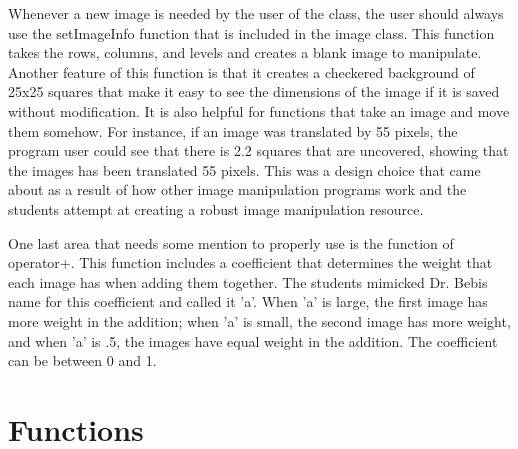 \documentclass[pdftex, 11pt]{article}
\begin{document}
Whenever a new image is needed by the user of the class, the user should always use the setImageInfo function that is
included in the image class. This function takes the rows, columns, and levels and creates a blank image to manipulate.
Another feature of this function is that it creates a checkered background of 25x25 squares that make it easy to see the
dimensions of the image if it is saved without modification. It is also helpful for functions that take an image and
move them somehow. For instance, if an image was translated by 55 pixels, the program user could see that there is 2.2
squares that are uncovered, showing that the images has been translated 55 pixels. This was a design choice that came
about as a result of how other image manipulation programs work and the students attempt at creating a robust image
manipulation resource.

One last area that needs some mention to properly use is the function of operator+. This function includes a coefficient
that determines the weight that each image has when adding them together. The students mimicked Dr. Bebis name for this
coefficient and called it 'a'. When 'a' is large, the first image has more weight in the addition; when 'a' is small,
the second image has more weight, and when 'a' is .5, the images have equal weight in the addition. The coefficient can
be between 0 and 1.

\section{Functions}
\end{document}

